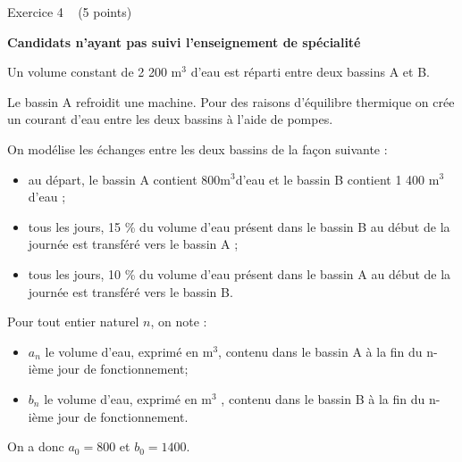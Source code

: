 
%
\begin{h2}Exercice 4   (5 points)\end{h2}
\textbf{Candidats n'ayant pas suivi l'enseignement de spécialité}
\par
Un volume constant de 2 200 $ \text{m}^{3}$ d'eau est réparti entre deux bassins A et B.
\par
Le bassin A refroidit une machine. Pour des raisons d'équilibre thermique on crée un courant d'eau entre les deux bassins à l'aide de pompes.
\par
On modélise les échanges entre les deux bassins de la façon suivante :
\begin{itemize}
     \item
     au départ, le bassin A contient 800$ \text{m}^{3}$d'eau et le bassin B contient 1 400 $ \text{m}^{3}$ d'eau ;
     \item
     tous les jours, 15 \% du volume d'eau présent dans le bassin B au début de la journée est transféré vers le bassin A ;
     \item
tous les jours, 10 \% du volume d'eau présent dans le bassin A au début de la journée est transféré vers le bassin B.\end{itemize}
Pour tout entier naturel $n$, on note :
\begin{itemize}
     \item
     $a_{n}$ le volume d'eau, exprimé en $ \text{m}^{3}$, contenu dans le bassin A à la fin du n-ième jour de fonctionnement;
     \item
     $b_{n}$ le volume d'eau, exprimé en $ \text{m}^{3}$ , contenu dans le bassin B à la fin du n-ième jour de
     fonctionnement.
\end{itemize}
On a donc $a_{0} = 800$ et $b_{0} = 1 400$.

